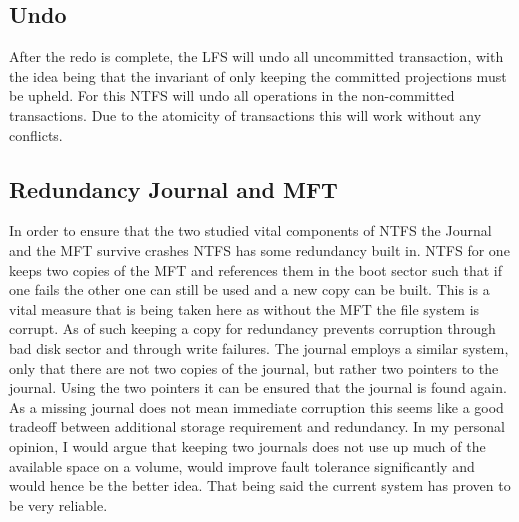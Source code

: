 \subsection*{Undo}
After the redo is complete, the LFS will undo all uncommitted transaction, with the idea being that the invariant of only keeping the committed projections must be upheld. For this NTFS will undo all operations in the non-committed transactions. Due to the atomicity of transactions this will work without any conflicts.
\subsection{Redundancy Journal and MFT}
In order to ensure that the two studied vital components of NTFS the Journal and the MFT survive crashes NTFS has some redundancy built in. NTFS for one keeps two copies of the MFT and references them in the boot sector such that if one fails the other one can still be used and a new copy can be built. This is a vital measure that is being taken here as without the MFT the file system is corrupt. As of such keeping a copy for redundancy prevents corruption through bad disk sector and through write failures. The journal employs a similar system, only  that there are not two copies of the journal, but rather two pointers to the journal. Using the two pointers it can be ensured that the journal is found again. As a missing journal does not mean immediate corruption this seems like a good tradeoff between additional storage requirement and redundancy. In my personal opinion, I would argue that keeping two journals does not use up much of the available space on a volume, would improve fault tolerance significantly and would hence be the better idea. That being said the current system has proven to be very reliable. \cite{RUSSINOVICH_ET_AL:2012:WI}
